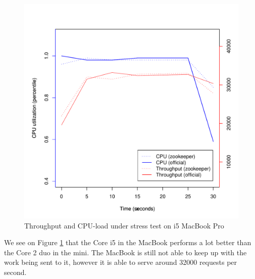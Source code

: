 \begin{figure}[h]
    \centering
    \includegraphics[width=1.0\textwidth]{results/throughput/singlenode/throughput_knut}
    \caption{Throughput and CPU-load under stress test on i5 MacBook Pro}
    \label{fig:thug_knut}
\end{figure}

We see on Figure \ref{fig:thug_knut} that the Core i5 in the MacBook performs a lot better than the Core 2 duo in the mini. The MacBook is still not able to keep up with the work being sent to it, however it is able to serve around 32000 requests per second. 

\clearpage


